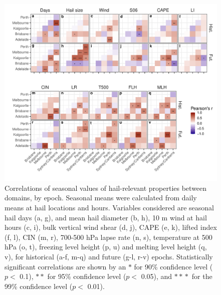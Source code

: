 \documentclass[draft,grl]{agutexSI2019}\usepackage[]{graphicx}\usepackage[]{xcolor}
\begin{document}
\begin{article}
\begin{figure}[!ht]
    \includegraphics[width=\textwidth]{figures/correlations}
    \caption{Correlations of seasonal values of hail-relevant properties
    between domains, by epoch. Seasonal means were calculated from daily means
    at hail locations and hours. Variables considered are seasonal hail days
    (a, g), and mean hail diameter (b, h), 10 m wind at hail hours (c, i),
    bulk vertical wind shear (d, j), CAPE (e, k), lifted index (f, l), CIN (m,
    r), 700-500 hPa lapse rate (n, s), temperature at 500 hPa (o, t), freezing
    level height (p, u) and melting level height (q, v), for historical (a-f,
    m-q) and future (g-l, r-v) epochs. Statistically significant correlations
    are shown by an $\ast{}$ for 90\% confidence level ($p <$ 0.1),
    $\ast{}\!\ast{}$ for 95\% confidence level ($p <$ 0.05), and
    $\ast{}\!\ast{}\!\!\ast{}$ for the 99\% confidence level ($p <$ 0.01).}
    \label{fig:correlations}
\end{figure}


\end{article}
\end{document}
